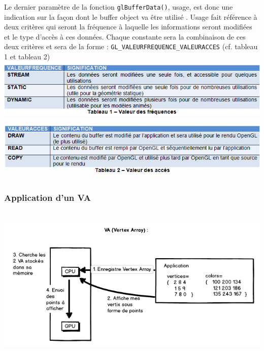 Le dernier paramètre de la fonction \verb|glBufferData()|, usage, est donc une indication sur la façon dont le buffer object va être utilisé . Usage fait référence à deux critères qui seront la fréquence à laquelle les informations seront modifiées et le type d’accès à ces données. Chaque constante sera la combinaison de ces deux critères et sera de la forme : \verb|GL_VALEURFREQUENCE_VALEURACCES| (cf. tableau 1 et tableau 2)
\\
\includegraphics[width=15cm,height=2.94cm]{img/tableau1.png}
\\
\includegraphics[width=15cm,height=3cm]{img/tableau2.png}

\subsubsection{Application d'un VA}
\includegraphics[width=15cm,height=7.48cm]{img/VA.png}
